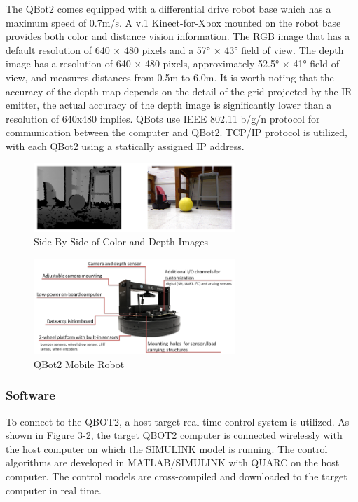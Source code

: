 \documentclass[conference]{IEEEtran}
\begin{document}
The QBot2 comes equipped with a differential drive robot base which has a maximum speed of 0.7m/s. A v.1 Kinect-for-Xbox mounted on the robot base provides both color and distance vision information.  The RGB image that has a default resolution of 640 $\times$ 480 pixels and a 57° $\times$ 43° field of view.  The depth image has a resolution of 640 $\times$ 480 pixels, approximately 52.5° $\times$ 41° field of view, and measures distances from 0.5m to 6.0m. It is worth noting that the accuracy of the depth map depends on the detail of the grid projected by the IR emitter, the actual accuracy of the depth image is significantly lower than a resolution of 640x480 implies.   QBots use IEEE 802.11 b/g/n protocol for communication between the computer and QBot2. TCP/IP protocol is utilized, with each QBot2 using a statically assigned IP address. 
\begin{figure}[htbp] %
     \centering
     \includegraphics[width=3in]{1.png} 
     \caption{Side-By-Side of Color and Depth Images}
     \label{fig:1}
  \end{figure}     


\begin{figure}[htbp] %
     \centering
     \includegraphics[width=3in]{2.png} 
     \caption{QBot2 Mobile Robot}
     \label{fig:2}
  \end{figure}     


\subsubsection{Software}
To connect to the QBOT2, a host-target real-time control system is utilized.   As shown in Figure 3-2, the target QBOT2 computer is connected wirelessly with the host computer on which the SIMULINK model is running. The control algorithms are developed in MATLAB/SIMULINK with QUARC on the host computer. The control models are cross-compiled and downloaded to the target computer in real time. 
\end{document}
